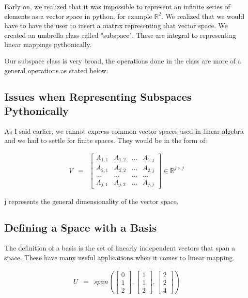\documentclass[12pt, a4paper]{article}
\begin{document}
Early on, we realized that it was impossible to represent an infinite series of elements as a vector space in python, for example $\mathbb{R}^{2}$. 
We realized that we would have to have the user to insert a matrix representing that vector space. We created an umbrella class called "subspace".
These are integral to representing linear mappings pythonically.

Our subspace class is very broad, the operations done in the class are more of a general operations as stated below.

\subsection{Issues when Representing Subspaces Pythonically}

As I said earlier, we cannot express common vector spaces used in linear algebra and we had to settle for finite spaces. They would be in the form of:

\begin{eqnarray*}
    V & = &\begin{bmatrix}
        A_{1,1}  & A_{1,2} & ... & A_{1,j}\\
        A_{2,1} & A_{2,2} & ... & A_{2,j}\\
        ... & ... & ... & ... \\
        A_{j,1} & A_{j,2} & ... & A_{j,j}
    \end{bmatrix}
    \in \mathbb{R}^{j \times j}
\end{eqnarray*}

j represents the general dimensionality of the vector space. 

\subsection{Defining a Space with a Basis}

The definition of a basis is the set of linearly independent vectors that span a space. 
These have many useful applications when it comes to linear mapping. 

\begin{eqnarray*}
    U &=& span(\begin{bmatrix}
        0 \\
        1 \\
        2
    \end{bmatrix}, 
    \begin{bmatrix}
        1 \\
        1 \\
        2 
    \end{bmatrix},
    \begin{bmatrix}
        2 \\
        2 \\
        4
    \end{bmatrix})
\end{eqnarray*}
\end{document}
